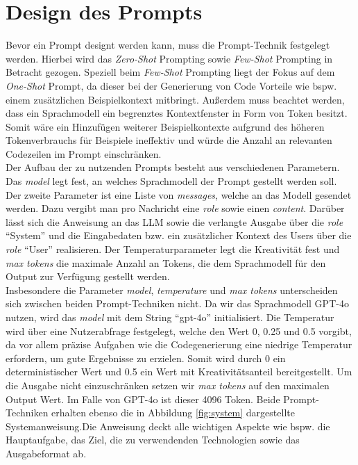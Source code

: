 \section{Design des Prompts}
Bevor ein Prompt designt werden kann, muss die Prompt-Technik festgelegt werden. Hierbei wird das \textit{Zero-Shot} Prompting sowie \textit{Few-Shot} Prompting in Betracht gezogen. Speziell beim \textit{Few-Shot} Prompting liegt der Fokus auf dem \textit{One-Shot} Prompt, da dieser bei der Generierung von Code Vorteile wie bspw. einem zusätzlichen Beispielkontext mitbringt. Außerdem muss beachtet werden, dass ein Sprachmodell ein begrenztes Kontextfenster in Form von Token besitzt. Somit wäre ein Hinzufügen weiterer Beispielkontexte aufgrund des höheren Tokenverbrauchs für Beispiele ineffektiv und würde die Anzahl an relevanten Codezeilen im Prompt einschränken.\\
Der Aufbau der zu nutzenden Prompts besteht aus verschiedenen Parametern. Das \textit{model} legt fest, an welches Sprachmodell der Prompt gestellt werden soll. Der zweite Parameter ist eine Liste von \textit{messages}, welche an das Modell gesendet werden. Dazu vergibt man pro Nachricht eine \textit{role} sowie einen \textit{content}. Darüber lässt sich die Anweisung an das LLM sowie die verlangte Ausgabe über die \textit{role} ``System'' und die Eingabedaten bzw. ein zusätzlicher Kontext des Users über die \textit{role} ``User'' realisieren. Der Temperaturparameter legt die Kreativität fest und \textit{max tokens} die maximale Anzahl an Tokens, die dem Sprachmodell für den Output zur Verfügung gestellt werden.\\
Insbesondere die Parameter \textit{model}, \textit{temperature} und \textit{max tokens} unterscheiden sich zwischen beiden Prompt-Techniken nicht. Da wir das Sprachmodell GPT-4o nutzen, wird das \textit{model} mit dem String ``gpt-4o'' initialisiert. Die Temperatur wird über eine Nutzerabfrage festgelegt, welche den Wert 0, 0.25 und 0.5 vorgibt, da vor allem präzise Aufgaben wie die Codegenerierung eine niedrige Temperatur erfordern, um gute Ergebnisse zu erzielen. \cite*{renzeEffectSamplingTemperature2024} Somit wird durch 0 ein deterministischer Wert und 0.5 ein Wert mit Kreativitätsanteil bereitgestellt. Um die Ausgabe nicht einzuschränken setzen wir \textit{max tokens} auf den maximalen Output Wert. Im Falle von GPT-4o ist dieser 4096 Token. Beide Prompt-Techniken erhalten ebenso die in Abbildung \ref{fig:system} dargestellte Systemanweisung.Die Anweisung deckt alle wichtigen Aspekte wie bspw. die Hauptaufgabe, das Ziel, die zu verwendenden Technologien sowie das Ausgabeformat ab. \\
